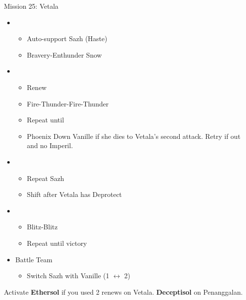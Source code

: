 \begin{multicols}{2}
\begin{battle}{Mission 25: Vetala}
\begin{itemize}
      \item \first
            \begin{itemize}
              \item Auto-support Sazh (Haste)
              \item Bravery-Enthunder Snow
            \end{itemize}
      \item \fifth
            \begin{itemize}
              \item Renew
              \item Fire-Thunder-Fire-Thunder
              \item Repeat until \stagger
              \item Phoenix Down Vanille if she dies to Vetala's second attack. Retry if out and no Imperil.
            \end{itemize}
            \columnbreak
      \item \first
            \begin{itemize}
              \item Repeat Sazh
              \item Shift after Vetala has Deprotect
            \end{itemize}
      \item \fourth
            \begin{itemize}
              \item Blitz-Blitz
              \item Repeat until victory
            \end{itemize}
    \end{itemize}
  \end{battle}
  \begin{menu}
    \begin{itemize}
      \paradigm
      \begin{itemize}
        \item {}%
              {\paradigmline{\syn}{(\rav)}{(\sen)}}%
              {\paradigmline[2]{\textit{\com}}{\textit{\rav}}{\textit{\rav}}}%
              {\paradigmline{(\rav)}{(\rav)}{(\sen)}}%
              {\paradigmline{\com}{(\rav)}{\com}}%
              {\paradigmline{\rav}{\sab}{(\sen)}}%
              {\paradigmline{\com}{\rav}{\com}}
      \end{itemize}
      \item Battle Team
            \begin{itemize}
              \item Switch Sazh with Vanille (1 $\leftrightarrow$ 2)
            \end{itemize}
    \end{itemize}
  \end{menu}
   Activate \textbf{Ethersol} if you used 2 renews on Vetala. \textbf{Deceptisol} on Penanggalan.
  \renewcommand{\second}{[2] Relentless Assault (\rav/\rav/\com)}
  \renewcommand{\third}{[3] Mystic Tower (\rav/\rav/\sen)}


\end{multicols}
